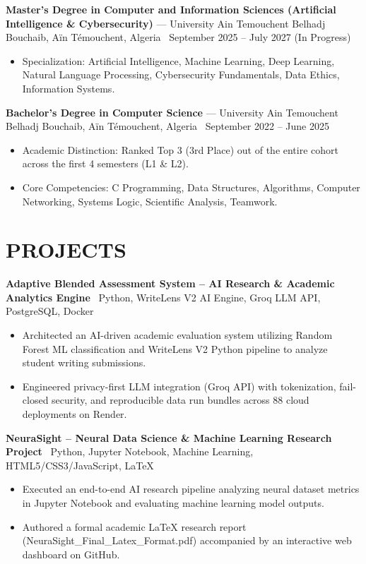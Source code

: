 \documentclass[10.5pt, letterpaper]{article}
\newcommand{\entry}[4]{%
  \noindent\textbf{#1} --- #3, #4 \textbar\ #2\par
  \vspace{2pt}
}
\newcommand{\projectentry}[2]{%
  \noindent\textbf{#1} \textbar\ #2\par
  \vspace{2pt}
}
\newcommand{\resumeItem}[1]{\item #1}
\begin{document}
\entry{Master's Degree in Computer and Information Sciences (Artificial Intelligence \& Cybersecurity)}{September 2025 -- July 2027 (In Progress)}{University Ain Temouchent Belhadj Bouchaib}{Aïn Témouchent, Algeria}
\begin{itemize}
  \resumeItem{Specialization: Artificial Intelligence, Machine Learning, Deep Learning, Natural Language Processing, Cybersecurity Fundamentals, Data Ethics, Information Systems.}
\end{itemize}

\entry{Bachelor's Degree in Computer Science}{September 2022 -- June 2025}{University Ain Temouchent Belhadj Bouchaib}{Aïn Témouchent, Algeria}
\begin{itemize}
  \resumeItem{Academic Distinction: Ranked Top 3 (3rd Place) out of the entire cohort across the first 4 semesters (L1 \& L2).}
  \resumeItem{Core Competencies: C Programming, Data Structures, Algorithms, Computer Networking, Systems Logic, Scientific Analysis, Teamwork.}
\end{itemize}

\section{PROJECTS}

\projectentry{Adaptive Blended Assessment System -- AI Research \& Academic Analytics Engine}{Python, WriteLens V2 AI Engine, Groq LLM API, PostgreSQL, Docker}
\begin{itemize}
  \resumeItem{Architected an AI-driven academic evaluation system utilizing Random Forest ML classification and WriteLens V2 Python pipeline to analyze student writing submissions.}
  \resumeItem{Engineered privacy-first LLM integration (Groq API) with tokenization, fail-closed security, and reproducible data run bundles across 88 cloud deployments on Render.}
\end{itemize}

\projectentry{NeuraSight -- Neural Data Science \& Machine Learning Research Project}{Python, Jupyter Notebook, Machine Learning, HTML5/CSS3/JavaScript, LaTeX}
\begin{itemize}
  \resumeItem{Executed an end-to-end AI research pipeline analyzing neural dataset metrics in Jupyter Notebook and evaluating machine learning model outputs.}
  \resumeItem{Authored a formal academic LaTeX research report (NeuraSight\_Final\_Latex\_Format.pdf) accompanied by an interactive web dashboard on GitHub.}
\end{itemize}
\end{document}
